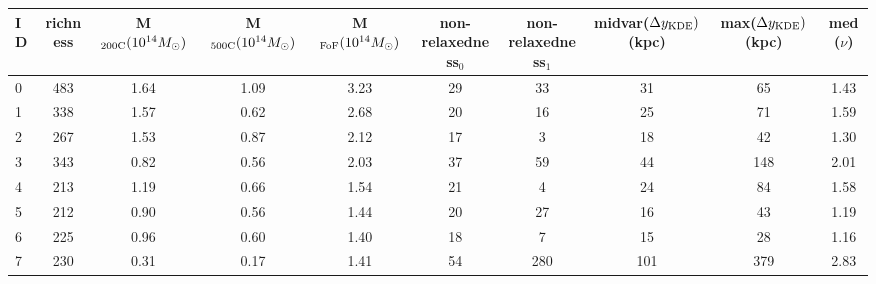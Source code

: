 \begin{tabular}{lccccccccc}
\toprule
ID & richness & M$_{\rm 200C} (10^{14} M_\odot)$ & M$_{\rm 500C} (10^{14}
M_\odot)$ & M$_{\rm FoF} (10^{14} M_\odot)$  & non-relaxedness$_0$ & non-relaxedness$_1$ & midvar($\Delta y_{\rm KDE})$ (kpc) & max($\Delta y_{\rm KDE})$ (kpc) & med($\nu$) \\
\midrule
 0 &      483 &                             1.64 &                             1.09 &                             3.23 &              29 &              33 &                                 31 &                              65 &       1.43 \\
 1 &      338 &                             1.57 &                             0.62 &                             2.68 &              20 &              16 &                                 25 &                              71 &       1.59 \\
 2 &      267 &                             1.53 &                             0.87 &                             2.12 &              17 &               3 &                                 18 &                              42 &       1.30 \\
 3 &      343 &                             0.82 &                             0.56 &                             2.03 &              37 &              59 &                                 44 &                             148 &       2.01 \\
 4 &      213 &                             1.19 &                             0.66 &                             1.54 &              21 &               4 &                                 24 &                              84 &       1.58 \\
 5 &      212 &                             0.90 &                             0.56 &                             1.44 &              20 &              27 &                                 16 &                              43 &       1.19 \\
 6 &      225 &                             0.96 &                             0.60 &                             1.40 &              18 &               7 &                                 15 &                              28 &       1.16 \\
 7 &      230 &                             0.31 &                             0.17 &                             1.41 &              54 &             280 &                                101 &                             379 &       2.83 \\

\end{tabular}
